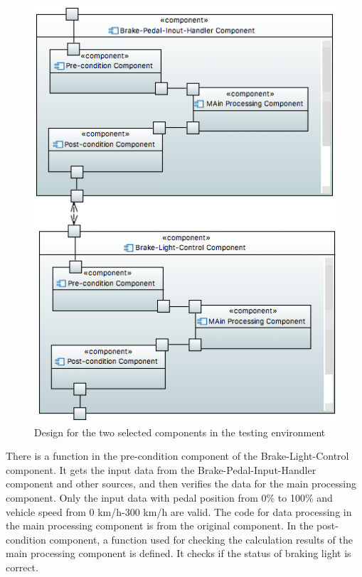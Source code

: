 \begin{figure}[htb]
\centering
\includegraphics[width=0.9\linewidth]{figure/component33.png}
\caption{Design for the two selected components in the testing environment}
\label{sec:testingEnvironment}
\end{figure}


There is a function in the pre-condition component of the Brake-Light-Control component. It gets the input data from the Brake-Pedal-Input-Handler component and other sources, and then verifies the data for the main processing component. Only the input data with pedal position from 0\% to 100\% and vehicle speed from 0 km/h-300 km/h are valid. The code for data processing in the main processing component is from the original component. In the post-condition component, a function used for checking the calculation results of the main processing component is defined. It checks if the status of braking light is correct.



